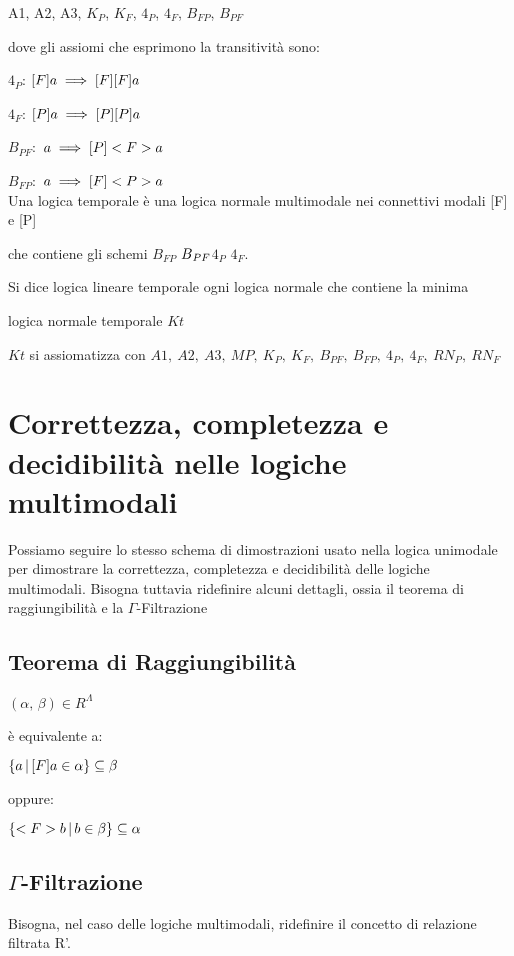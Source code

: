 A1, A2, A3, $K_{P}$, $K_{F}$, $4_{P}$, $4_{F}$, $B_{FP}$, $B_{PF}$

dove gli assiomi che esprimono la transitività sono:

$4_{P}$: $[F]a\implies[F][F]a$

$4_{F}$: $[P]a\implies[P][P]a$

$B_{PF}:$ $a\implies[P]<F>a$

$B_{FP}:$ $a\implies[F]<P>a$\\


Una logica temporale è una logica normale multimodale nei connettivi
modali {[}F{]} e {[}P{]}

che contiene gli schemi $B_{FP}$ $B\mbox{\ensuremath{_{PF}}}$$4_{P}$
$4_{F}$.

Si dice logica lineare temporale ogni logica normale che contiene
la minima

logica normale temporale $Kt$

$Kt$ si assiomatizza con $A1,\ A2,\ A3,\ MP,\ K_{P},\ K_{F},\ B_{PF},\ B_{FP},\ 4_{P},\ 4_{F},\ RN_{P},\ RN_{F}$


\section{Correttezza, completezza e decidibilità nelle logiche multimodali}

Possiamo seguire lo stesso schema di dimostrazioni usato nella logica
unimodale per dimostrare la correttezza, completezza e decidibilità
delle logiche multimodali. Bisogna tuttavia ridefinire alcuni dettagli,
ossia il teorema di raggiungibilità e la $\Gamma$-Filtrazione


\subsection{Teorema di Raggiungibilità}

$(\alpha,\,\beta)\in R^{\Lambda}$

è equivalente a:

$\{a\,|\,[F]a\in\alpha\}\subseteq\beta$

oppure:

$\{<F>b\,|\, b\in\beta\}\subseteq\alpha$


\subsection{$\Gamma$-Filtrazione}

Bisogna, nel caso delle logiche multimodali, ridefinire il concetto
di relazione filtrata R'.

